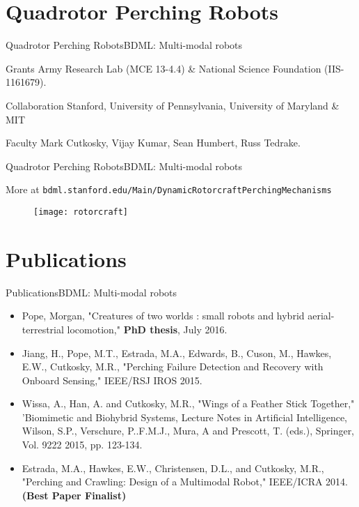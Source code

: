 \documentclass{beamer}
\begin{document}
\section{Quadrotor Perching Robots}

\begin{frame}{Quadrotor Perching Robots}{BDML: Multi-modal robots}
\begin{block}{Grants}
Army Research Lab (MCE 13-4.4) \& National Science Foundation (IIS-1161679).
\end{block}

\begin{block}{Collaboration}
Stanford, University of Pennsylvania, University of Maryland \& MIT
\end{block}

\begin{block}{Faculty}
Mark Cutkosky, Vijay Kumar, Sean Humbert, Russ Tedrake.
\end{block}
\end{frame}

\begin{frame}{Quadrotor Perching Robots}{BDML: Multi-modal robots}
\begin{block}{More at}
\texttt{bdml.stanford.edu/Main/DynamicRotorcraftPerchingMechanisms}
\end{block}

\begin{figure}[h]
  \centering
  \texttt{[image: rotorcraft]}
  \label{fig:rotorcraft}
\end{figure}
\end{frame}

\section{Publications}

\begin{frame}{Publications}{BDML: Multi-modal robots}

\begin{itemize}
  \item Pope, Morgan, "Creatures of two worlds : small robots and hybrid aerial-terrestrial locomotion," \textbf{PhD thesis}, July 2016.
  \item Jiang, H., Pope, M.T., Estrada, M.A., Edwards, B., Cuson, M., Hawkes, E.W., Cutkosky, M.R., "Perching Failure Detection and Recovery with Onboard Sensing," IEEE/RSJ IROS 2015.
  \item Wissa, A., Han, A. and Cutkosky, M.R., "Wings of a Feather Stick Together," 'Biomimetic and Biohybrid Systems, Lecture Notes in Artificial Intelligence, Wilson, S.P., Verschure, P..F.M.J., Mura, A and Prescott, T. (eds.), Springer, Vol. 9222 2015, pp. 123-134.
  \item Estrada, M.A., Hawkes, E.W., Christensen, D.L., and Cutkosky, M.R., "Perching and Crawling: Design of a Multimodal Robot," IEEE/ICRA 2014. \textbf{(Best Paper Finalist)}
\end{itemize}

\end{frame}
\end{document}
